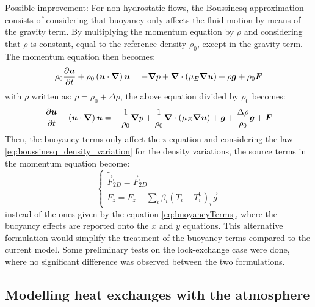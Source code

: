 \begin{CommentBlock}{Possible improvement:}
For non-hydrostatic flows, the Boussinesq approximation consists of considering that
buoyancy only affects the fluid motion by means of the gravity term.
By multiplying the momentum equation by $\rho$ and considering that $\rho$
is constant, equal to the reference density $\rho_0$, except in the gravity term.
The momentum equation then becomes:
\begin{equation}
      \rho_0\dfrac{\partial \bm{u} }{\partial t}
      + \rho_0\left(\bm{u}\cdot\bm{\nabla}\right)\bm{u} = - \bm{\nabla} p
      + \bm{\nabla} \cdot \left(\mu_E \bm{\nabla} \bm{u}\right) + \rho\bm{g} + \rho_0\bm{F}
\end{equation}
with $\rho$ written as: $\rho = \rho_0 + \Delta \rho$, the above equation divided by $\rho_0$ becomes:
\begin{equation}
      \dfrac{\partial \bm{u} }{\partial t}
      + \left(\bm{u}\cdot\bm{\nabla}\right)\bm{u} = - \dfrac{1}{\rho_0}\bm{\nabla} p
      + \dfrac{1}{\rho_0}\bm{\nabla} \cdot \left(\mu_E \bm{\nabla} \bm{u}\right) + \bm{g}
      + \dfrac{\Delta \rho}{\rho_0}\bm{g} + \bm{F}
\end{equation}
Then, the buoyancy terms only affect the z-equation and considering the law \eqref{eq:boussinesq_density_variation} for
the density variations, the source terms in the momentum equation become:
\begin{equation}\left\{\begin{array}{l}
  \tilde{\vec{F}}_{2D} = \vec{F}_{2D}\\
    \tilde{F}_{z} = F_{z}-\sum\limits_{i}\beta_{i}\left(  T_{i}-T_{i}%
^{0}\right)  _{i}\vec{g}\end{array}\right.
  \label{eq:alternativeBuoyancyTerms}
\end{equation}
instead of the ones given by the equation \eqref{eq:buoyancyTerms}, where the buoyancy effects are reported onto the $x$ and $y$ equations. This alternative formulation would simplify the treatment
of the buoyancy terms compared to the current model. Some preliminary tests on the lock-exchange
case were done, where no significant difference was observed between the two formulations.
\end{CommentBlock}

\subsection{\label{echanges thermiques}Modelling heat exchanges with the atmosphere%
}

